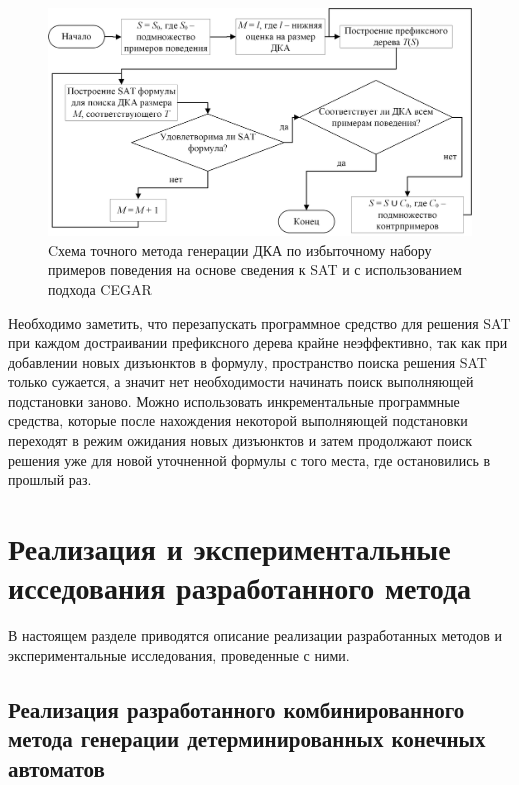 \begin{figure}[ht]
  \centering
  \includegraphics[scale=0.5]{img/ntv/cegar.jpg}
  \caption{Cхема точного метода генерации ДКА по избыточному набору примеров поведения на основе сведения к SAT и с использованием подхода CEGAR}
  \label{img:cegar-algo}
\end{figure}

Необходимо заметить, что перезапускать программное средство для решения SAT при каждом достраивании префиксного дерева крайне неэффективно, так как при добавлении новых дизъюнктов в формулу, пространство поиска решения SAT только сужается, а значит нет необходимости начинать поиск выполняющей подстановки заново.
Можно использовать инкрементальные программные средства, которые после нахождения некоторой выполняющей подстановки переходят в режим ожидания новых дизъюнктов и затем продолжают поиск решения уже для новой уточненной формулы с того места, где остановились в прошлый раз.



\section{Реализация и экспериментальные исседования разработанного метода}
\label{sec:cegar:results}

В настоящем разделе приводятся описание реализации разработанных методов и экспериментальные исследования, проведенные с ними.


\subsection{Реализация разработанного комбинированного метода генерации детерминированных конечных автоматов}
\label{sec:cegar:results:impl}


